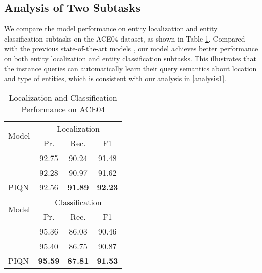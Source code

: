 \documentclass[11pt]{article}
\begin{document}
\subsection{Analysis of Two Subtasks}

\label{app:subtask}

We compare the model performance on entity localization and entity classification subtasks on the ACE04 dataset, as shown in Table \ref{tab:clsandloc}. Compared with the previous state-of-the-art models \citep{tan2021sequencetoset, shen2021locateandlabel}, our model achieves better performance on both entity localization and entity classification subtasks. This illustrates that the instance queries can automatically learn their query semantics about location and type of entities, which is consistent with our analysis in \ref{analysis1}.





\begin{table}[h]
\centering
\small
\begin{tabular}{lccc}

\toprule
\multirow{2}{*}{Model}   & \multicolumn{3}{c}{Localization}  \\
 \cmidrule(lr){2-4} 
& Pr.  & Rec. & F1  \\
\midrule
 \citet{tan2021sequencetoset} & 92.75  &      90.24    &    91.48    \\
\citet{shen2021locateandlabel} & 92.28  &      90.97   &     91.62  \\
PIQN    & {92.56}      &  \textbf{91.89}    &    \textbf{92.23}  \\


\bottomrule
\toprule
\multirow{2}{*}{Model}   & \multicolumn{3}{c}{Classification}  \\
 \cmidrule(lr){2-4} 
& Pr.  & Rec. & F1  \\
\midrule
\citet{tan2021sequencetoset}  & 95.36   &     86.03      &  90.46    \\
\citet{shen2021locateandlabel} & 95.40  &      86.75   &     90.87  \\
PIQN    &  \textbf{95.59}    &     \textbf{87.81}     &    \textbf{91.53} \\


\bottomrule
\end{tabular}
\caption{Localization and Classification Performance on ACE04}
\label{tab:clsandloc}
\end{table}
\end{document}
